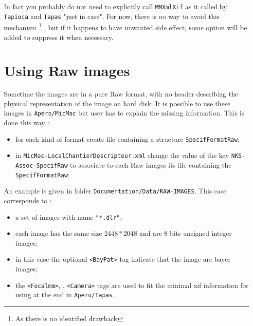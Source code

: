 In fact you probably do not need to explicitly call  {\tt MMXmlXif} as it called by {\tt Tapioca} and {\tt Tapas}
"just in case". For now, there is no way to avoid this mechanism \footnote{As there is no identified drawback}
, but if it happens to have unwanted side effect,
some option will be added to suppress it when necessary.





\section{Using Raw images}

Sometime the images are in a pure Raw format, with no header describing the physical representation
of the image on hard disk. It is possible to use these images in {\tt Apero/MicMac} but user has
to explain the missing information. This is done this way :

\begin{itemize}
       \item for each kind of format create file containing a structure {\tt SpecifFormatRaw};

       \item in {\tt MicMac-LocalChantierDescripteur.xml} change the value of the key {\tt NKS-Assoc-SpecifRaw} to associate to each Raw images its file containing the {\tt SpecifFormatRaw};

\end{itemize}

An example is given in folder {\tt Documentation/Data/RAW-IMAGES}. This case corresponds to :


\begin{itemize}

       \item a set of images with name {\tt "*.dlr"};

       \item each image has the same size $2448 * 2048$ and are $8$ bits unsigned integer images;

       \item in this case the optional {\tt <BayPat>} tag indicate that the image are bayer images;

       \item the {\tt <Focalmm>}, {\tt <FocalEqui35>} , {\tt <Camera>} tags are used to fit the minimal
	     xif information for using at the end in {\tt Apero/Tapas}.

\end{itemize}

